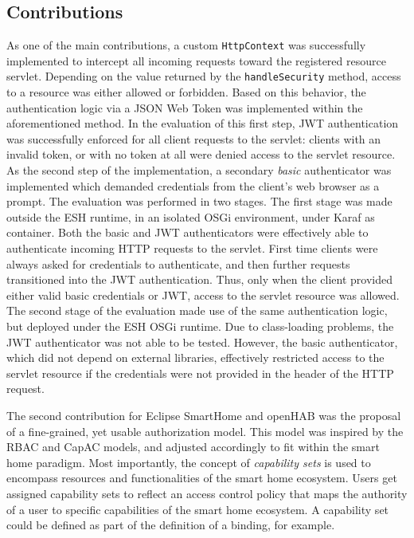 \documentclass[12pt]{article}
\begin{document}
\subsection{Contributions}

As one of the main contributions, a custom \texttt{HttpContext} was successfully implemented to intercept all incoming requests toward the registered resource servlet. Depending on the value returned by the \texttt{handleSecurity} method, access to a resource was either allowed or forbidden. Based on this behavior, the authentication logic via a JSON Web Token was implemented within the aforementioned method. In the evaluation of this first step, JWT authentication was successfully enforced for all client requests to the servlet: clients with an invalid token, or with no token at all were denied access to the servlet resource. As the second step of the implementation, a secondary \emph{basic} authenticator was implemented which demanded credentials from the client's web browser as a prompt. The evaluation was performed in two stages. The first stage was made outside the ESH runtime, in an isolated OSGi environment, under Karaf as container. Both the basic and JWT authenticators were effectively able to authenticate incoming HTTP requests to the servlet. First time clients were always asked for credentials to authenticate, and then further requests transitioned into the JWT authentication. Thus, only when the client provided either valid basic credentials or JWT, access to the servlet resource was allowed. The second stage of the evaluation made use of the same authentication logic, but deployed under the ESH OSGi runtime. Due to class-loading problems, the JWT authenticator was not able to be tested. However, the basic authenticator, which did not depend on external libraries, effectively restricted access to the servlet resource if the credentials were not provided in the header of the HTTP request.

The second contribution for Eclipse SmartHome and openHAB was the proposal of a fine-grained, yet usable authorization model. This model was inspired by the RBAC and CapAC models, and adjusted accordingly to fit within the smart home paradigm. Most importantly, the concept of \emph{capability sets} is used to encompass resources and functionalities of the smart home ecosystem. Users get assigned capability sets to reflect an access control policy that maps the authority of a user to specific capabilities of the smart home ecosystem. A capability set could be defined as part of the definition of a binding, for example.
\end{document}
